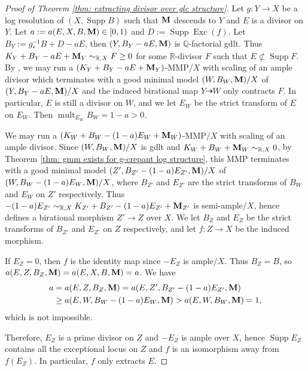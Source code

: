 \documentclass[11pt]{amsart}
\numberwithin{equation}{section}
\newcommand{\Mm}{{\bf{M}}}
\newcommand{\Exc}{\operatorname{Exc}}
\newcommand{\Supp}{\operatorname{Supp}}
\newcommand{\mult}{\operatorname{mult}}
\theoremstyle{definition}
\theoremstyle{definition}
\theoremstyle{definition}
\begin{document}
\begin{proof}[Proof of Theorem \ref{thm: extracting divisor over glc structure}]
Let $g: Y\rightarrow X$ be a log resolution of $(X,\Supp B)$ such that $\Mm$ descends to $Y$ and $E$ is a divisor on $Y$. Let $a:=a(E,X,B,\Mm)\in[0,1)$ and $D:=\Supp\Exc(f)$. Let $B_Y:=g^{-1}_*B+D-aE$, then $(Y,B_Y-aE,\Mm)$ is $\mathbb Q$-factorial gdlt. Thus $K_Y+B_Y-aE+\Mm_Y\sim_{\mathbb R,X}F\geq 0$ for some $\mathbb R$-divisor $F$ such that $E\not\subset\Supp F$. By \cite[Lemma 2.3]{LX22}, we may run a $(K_Y+B_Y-aE+\Mm_Y)$-MMP$/X$ with scaling of an ample divisor which terminates with a good minimal model $(W,B_W,\Mm)/X$ of $(Y,B_Y-aE,\Mm)/X$ and the induced birational map $Y\dashrightarrow W$ only contracts $F$. In particular, $E$ is still a divisor on $W$, and we let $E_W$ be the strict transform of $E$ on $E_W$. Then $\mult_{E_W}B_W=1-a>0$.

We may run a $(K_W+B_W-(1-a)E_W+\Mm_W)$-MMP$/X$ with scaling of an ample divisor. Since $(W,B_W,\Mm)/X$ is gdlt and $K_W+B_W+\Mm_W\sim_{\mathbb R,X}0$, by Theorem \ref{thm: gmm exists for g-crepant log structure}, this MMP terminates with a good minimal model $(Z',B_{Z'}-(1-a)E_{Z'},\Mm)/X$ of $(W,B_W-(1-a)E_W,\Mm)/X$, where $B_{Z'}$ and $E_{Z'}$ are the strict transforms of $B_W$ and $E_W$ on $Z'$ respectively. Thus  $-(1-a)E_{Z'}\sim_{\mathbb R,X}K_{Z'}+B_{Z'}-(1-a)E_{Z'}+\Mm_{Z'}$ is semi-ample$/X$, hence defines a birational morphism $Z'\rightarrow Z$ over $X$. We let $B_Z$ and $E_Z$ be the strict transforms of $B_{Z'}$ and $E_{Z'}$ on $Z$ respectively, and let $f: Z\rightarrow X$ be the induced morphism.


If $E_Z=0$, then $f$ is the identity map since $-E_Z$ is ample$/X$. Thus $B_Z=B$, so $a(E,Z,B_Z,\Mm)=a(E,X,B,\Mm)=a$. We have
\begin{align*}
    a&=a(E,Z,B_Z,\Mm)=a(E,Z',B_{Z'}-(1-a)E_{Z'},\Mm)\\
    &\geq a(E,W,B_W-(1-a)E_W,\Mm)>a(E,W,B_W,\Mm)=1,
\end{align*}
which is not impossible.

Therefore, $E_Z$ is a prime divisor on $Z$ and $-E_Z$ is ample over $X$, hence $\Supp E_Z$ contains all the exceptional locus on $Z$ and $f$ is an isomorphism away from $f(E_Z)$. In particular, $f$ only extracts $E$.
\end{proof}
\end{document}
